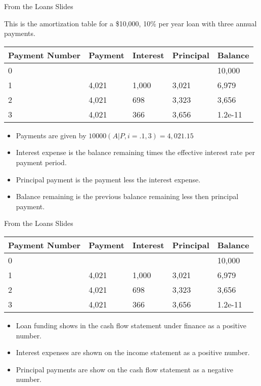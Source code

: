 \documentclass[ignorenonframetext,]{beamer}
\providecommand{\tightlist}{%
  \setlength{\itemsep}{0pt}\setlength{\parskip}{0pt}}
\begin{document}
\begin{frame}{From the Loans Slides}

This is the amortization table for a \$10,000, 10\% per year loan with
three annual payments.

\begin{longtable}[]{@{}lllll@{}}
\toprule
Payment Number & Payment & Interest & Principal & Balance\tabularnewline
\midrule
\endhead
0 & & & & 10,000\tabularnewline
1 & 4,021 & 1,000 & 3,021 & 6,979\tabularnewline
2 & 4,021 & 698 & 3,323 & 3,656\tabularnewline
3 & 4,021 & 366 & 3,656 & 1.2e-11\tabularnewline
\bottomrule
\end{longtable}

\begin{itemize}
\tightlist
\item
  Payments are given by \(10000 (A|P, i = .1, 3) = 4,021.15\)
\item
  Interest expense is the balance remaining times the effective interest
  rate per payment period.
\item
  Principal payment is the payment less the interest expense.
\item
  Balance remaining is the previous balance remaining less then
  principal payment.
\end{itemize}

\end{frame}

\begin{frame}{From the Loans Slides}

\begin{longtable}[]{@{}lllll@{}}
\toprule
Payment Number & Payment & Interest & Principal & Balance\tabularnewline
\midrule
\endhead
0 & & & & 10,000\tabularnewline
1 & 4,021 & 1,000 & 3,021 & 6,979\tabularnewline
2 & 4,021 & 698 & 3,323 & 3,656\tabularnewline
3 & 4,021 & 366 & 3,656 & 1.2e-11\tabularnewline
\bottomrule
\end{longtable}

\begin{itemize}
\tightlist
\item
  Loan funding shows in the cash flow statement under finance as a
  positive number.
\item
  Interest expenses are shown on the income statement as a positive
  number.
\item
  Principal payments are show on the cash flow statement as a negative
  number.
\end{itemize}

\end{frame}
\end{document}
